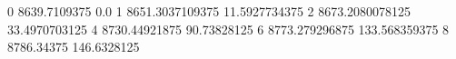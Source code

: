 0 8639.7109375 0.0
1 8651.3037109375 11.5927734375
2 8673.2080078125 33.4970703125
4 8730.44921875 90.73828125
6 8773.279296875 133.568359375
8 8786.34375 146.6328125
